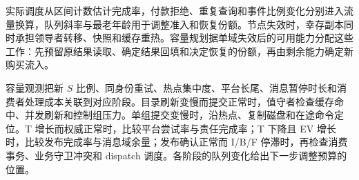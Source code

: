 
实际调度从区间计数估计完成率，付款拒绝、重复查询和事件比例变化分别进入流量换算，队列斜率与最老年龄用于调整准入和恢复份额。节点失效时，幸存副本同时承担领导者转移、快照和缓存重热。容量规划据单域失效后的可用能力分配这些工作：先预留原结果读取、确定结果回填和决定恢复的份额，再由剩余能力确定新购买流入。

容量观测把新 $S$ 比例、同身份重试、热点集中度、平台长尾、消息暂停时长和消费者处理成本关联到对应阶段。目录刷新变慢而提交正常时，值守者检查缓存命中、并发刷新和控制组压力。单组提交变慢时，沿热点、复制磁盘和在途命令定位。T 增长而权威正常时，比较平台尝试率与责任完成率；T 下降且 EV 增长时，比较发布完成率与消息域余量；发布确认正常而 I/B/F 停滞时，再检查消费事务、业务守卫冲突和 dispatch 调度。各阶段的队列变化给出下一步调整预算的位置。
